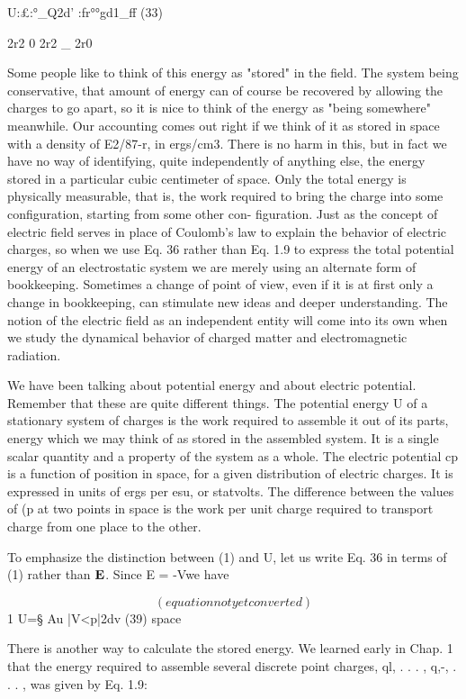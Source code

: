 U:£:°_Q2d' :fr°°gd1_ff (33)

2r2 0 2r2 _ 2r0

 

Some people like to think of this energy as "stored" in the field.
The system being conservative, that amount of energy can of course
be recovered by allowing the charges to go apart, so it is nice to think
of the energy as "being somewhere" meanwhile. Our accounting
comes out right if we think of it as stored in space with a density of
E2/87-r, in ergs/cm3. There is no harm in this, but in fact we have no
way of identifying, quite independently of anything else, the energy
stored in a particular cubic centimeter of space. Only the total
energy is physically measurable, that is, the work required to bring
the charge into some configuration, starting from some other con-
figuration. Just as the concept of electric field serves in place of
Coulomb's law to explain the behavior of electric charges, so when
we use Eq. 36 rather than Eq. 1.9 to express the total potential energy
of an electrostatic system we are merely using an alternate form of
bookkeeping. Sometimes a change of point of view, even if it is at
first only a change in bookkeeping, can stimulate new ideas and
deeper understanding. The notion of the electric field as an independent
entity will come into its own when we study the dynamical
behavior of charged matter and electromagnetic radiation.

We have been talking about potential energy and about electric
potential. Remember that these are quite different things. The potential
energy U of a stationary system of charges is the work required
to assemble it out of its parts, energy which we may think of as stored
in the assembled system. It is a single scalar quantity and a property
of the system as a whole. The electric potential cp is a function of
position in space, for a given distribution of electric charges. It is
expressed in units of ergs per esu, or statvolts. The difference between
the values of (p at two points in space is the work per unit
charge required to transport charge from one place to the other.

To emphasize the distinction between (1) and U, let us write Eq. 36
in terms of (1) rather than $\mathbf{E}$. Since E = -V\pot we have

\begin{equation}
(equation not yet converted)
\end{equation}
1
U=§ Au |V<p|2dv (39)
space

There is another way to calculate the stored energy. We learned
early in Chap. 1 that the energy required to assemble several discrete
point charges, ql, . . . , q,-, . . . , was given by Eq. 1.9:

